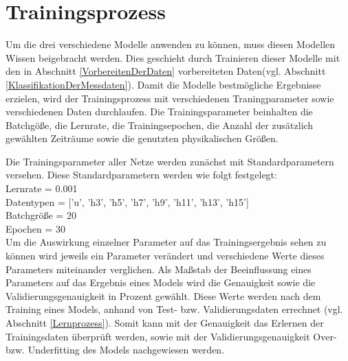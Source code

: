 \section{Trainingsprozess}
    Um die drei verschiedene Modelle anwenden zu können, muss diesen Modellen Wissen beigebracht werden.
    Dies geschieht durch Trainieren dieser Modelle mit den in Abschnitt \ref{VorbereitenDerDaten} vorbereiteten Daten(vgl. Abschnitt \ref{KlassifikationDerMessdaten}).
    Damit die Modelle bestmögliche Ergebnisse erzielen, wird der Trainingsprozess mit verschiedenen Traningparameter sowie verschiedenen Daten durchlaufen.
    Die Trainingsparameter beinhalten die Batchgöße, die Lernrate, die Trainingsepochen, die Anzahl der zusätzlich gewählten Zeiträume sowie die genutzten physikalischen Größen.
    \newline

    \noindent
    Die Trainingsparameter aller Netze werden zunächst mit Standardparametern versehen.
    \newline
    \noindent
    Diese Standardparametern werden wie folgt festgelegt:\\
    \noindent
    Lernrate = 0.001\\
    \noindent
    Datentypen = ['u', 'h3', 'h5', 'h7', 'h9', 'h11', 'h13', 'h15']\\
    \noindent
    Batchgröße = 20\\
    \noindent
    Epochen = 30\\

    \noindent
    Um die Auswirkung einzelner Parameter auf das Trainingsergebnis sehen zu können wird jeweils ein Parameter verändert und verschiedene Werte dieses Parameters miteinander verglichen.
    \newline
    \noindent
    Als Maßstab der Beeinflussung eines Parameters auf das Ergebnis eines Models wird die Genauigkeit sowie die Validierungsgenauigkeit in Prozent gewählt.
    Diese Werte werden nach dem Training eines Models, anhand von Test- bzw. Validierungsdaten errechnet (vgl. Abschnitt \ref{Lernprozess}). 
    Somit kann mit der Genauigkeit das Erlernen der Trainingsdaten überprüft werden, sowie mit der Validierungsgenauigkeit Over- bzw. Underfitting des Models nachgewiesen werden.
    \newline

